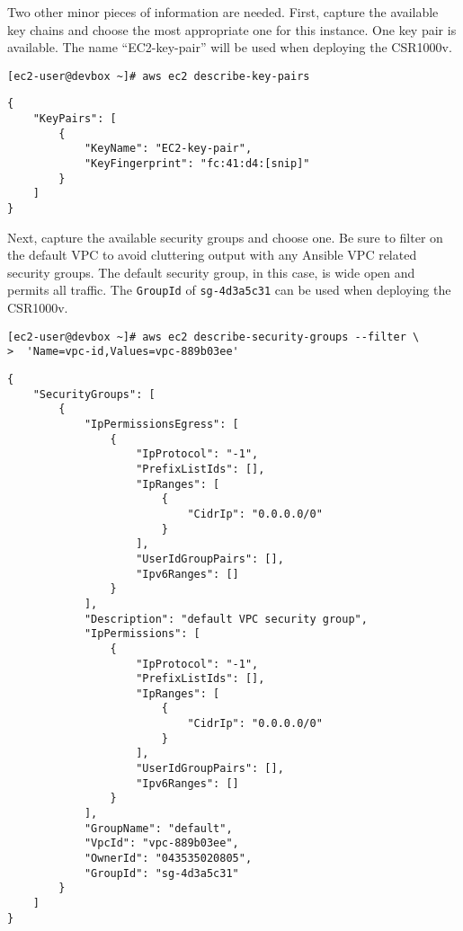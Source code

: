 Two other minor pieces of information are needed. First, capture the available
key chains and choose the most appropriate one for this instance. One key pair
is available. The name ``EC2-key-pair'' will be used when deploying the CSR1000v.

\begin{verbatim}
[ec2-user@devbox ~]# aws ec2 describe-key-pairs
\end{verbatim}

\begin{verbatim}
{
    "KeyPairs": [
        {
            "KeyName": "EC2-key-pair", 
            "KeyFingerprint": "fc:41:d4:[snip]"
        }
    ]
}
\end{verbatim}

Next, capture the available security groups and choose one. Be sure to filter
on the default VPC to avoid cluttering output with any Ansible VPC related
security groups. The default security group, in this case, is wide open and
permits all traffic. The \verb|GroupId| of \verb|sg-4d3a5c31| can be used
when deploying the CSR1000v.

\begin{verbatim}
[ec2-user@devbox ~]# aws ec2 describe-security-groups --filter \
>  'Name=vpc-id,Values=vpc-889b03ee'
\end{verbatim}

\begin{verbatim}
{
    "SecurityGroups": [
        {
            "IpPermissionsEgress": [
                {
                    "IpProtocol": "-1", 
                    "PrefixListIds": [], 
                    "IpRanges": [
                        {
                            "CidrIp": "0.0.0.0/0"
                        }
                    ], 
                    "UserIdGroupPairs": [], 
                    "Ipv6Ranges": []
                }
            ], 
            "Description": "default VPC security group", 
            "IpPermissions": [
                {
                    "IpProtocol": "-1", 
                    "PrefixListIds": [], 
                    "IpRanges": [
                        {
                            "CidrIp": "0.0.0.0/0"
                        }
                    ], 
                    "UserIdGroupPairs": [], 
                    "Ipv6Ranges": []
                }
            ], 
            "GroupName": "default", 
            "VpcId": "vpc-889b03ee", 
            "OwnerId": "043535020805", 
            "GroupId": "sg-4d3a5c31"
        }
    ]
}
\end{verbatim}

